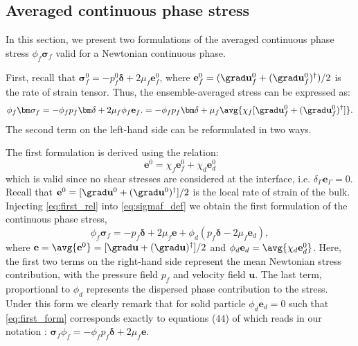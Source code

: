 \subsection{Averaged continuous phase stress}

In this section, we present two formulations of the averaged continuous phase stress $\phi_f\bm\sigma_f$ valid for a Newtonian continuous phase. 

First, recall that $\bm\sigma_f^0 = -p_f^0 \bm\delta +2  \mu_f \textbf{e}_f^0$, where $\textbf{e}_f^0 = (\grad \textbf{u}_f^0 + (\grad \textbf{u}_f^0)^\dagger)/2$ is the rate of strain tensor. 
Thus, the ensemble-averaged stress can be expressed as:
\begin{equation}
    \phi_f\bm\sigma_f
    = 
    -\phi_f p_f \bm\delta + 2 \mu_f \phi_f \textbf{e}_f. 
    = 
    -\phi_f p_f \bm\delta + \mu_f \avg{\chi_f [\grad \textbf{u}_f^0 + (\grad \textbf{u}_f^0)^\dagger]}. 
    \label{eq:sigmaf_def}
\end{equation}
The second term on the left-hand side can be reformulated in two ways. 

The first formulation is derived using the relation: 
\begin{equation}
    \textbf{e}^0
    = 
    \chi_f \textbf{e}_f^0
    + 
    \chi_d \textbf{e}_d^0
    \label{eq:first_rel}
\end{equation}
which is valid since no shear stresses are considered at the interface, i.e. $\delta_\Gamma\textbf{e}_\Gamma = 0$. 
Recall that $\textbf{e}^0 = [\grad \textbf{u}^0 + (\grad \textbf{u}^0)^\dagger]/2$ is the local rate of strain of the bulk.  
Injecting \ref{eq:first_rel} into \ref{eq:sigmaf_def} we obtain the first formulation of the continuous phase stress, 
\begin{equation}
    \phi_f\bm\sigma_f
    = 
    - p_f \bm\delta + 2 \mu_f \textbf{e}
    +\phi_d ( p_f\bm\delta - 2 \mu_f \textbf{e}_d), 
    \label{eq:first_form}
\end{equation}
where $\textbf{e} = \avg{\textbf{e}^0} = [\grad \textbf{u} + (\grad \textbf{u})^\dagger]/2$ and $\phi_d \textbf{e}_d = \avg{\chi_d \textbf{e}_d^0}$. 
Here, the first two terms on the right-hand side represent the mean Newtonian stress contribution, with the pressure field $p_f$ and velocity field $\textbf{u}$.
The last term, proportional to $\phi_d$ represents the dispersed phase contribution to the stress.
Under this form we clearly remark that for solid particle $\phi_d \textbf{e}_d = 0$ such that \ref{eq:first_form} corresponds exactly to equations (44) of \citet{jackson1997locally} which reads in our notation : $\bm\sigma_f\phi_f =-\phi_f p_f \bm\delta + 2 \mu_f \textbf{e}$. 

